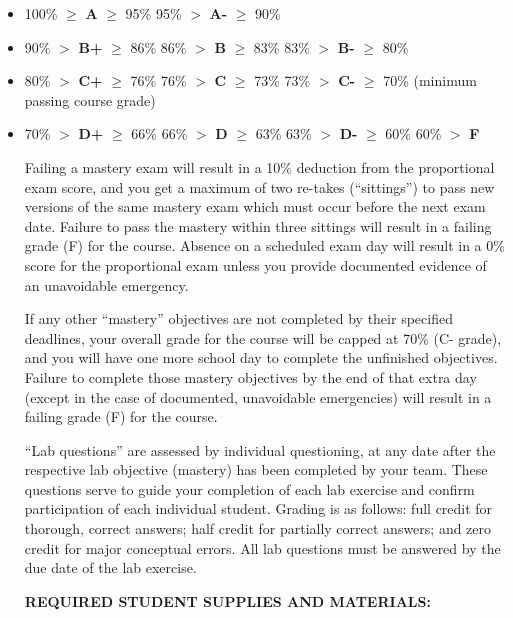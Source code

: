 \begin{itemize}
\item{} 100\% $\geq$ {\bf A} $\geq$ 95\% \hskip 33pt 95\% $>$ {\bf A-} $\geq$ 90\%
\item{} 90\% $>$ {\bf B+} $\geq$ 86\% \hskip 30pt 86\% $>$ {\bf B} $\geq$ 83\% \hskip 30pt 83\% $>$ {\bf B-} $\geq$ 80\%
\item{} 80\% $>$ {\bf C+} $\geq$ 76\% \hskip 30pt 76\% $>$ {\bf C} $\geq$ 73\% \hskip 30pt 73\% $>$ {\bf C-} $\geq$ 70\% (minimum passing course grade)
\item{} 70\% $>$ {\bf D+} $\geq$ 66\% \hskip 30pt 66\% $>$ {\bf D} $\geq$ 63\% \hskip 30pt 63\% $>$ {\bf D-} $\geq$ 60\% \hskip 30pt 60\% $>$ {\bf F}
\medskip

\vskip 10pt

Failing a mastery exam will result in a 10\% deduction from the proportional exam score, and you get a maximum of two re-takes (``sittings'') to pass new versions of the same mastery exam which must occur before the next exam date.  Failure to pass the mastery within three sittings will result in a failing grade (F) for the course.  Absence on a scheduled exam day will result in a 0\% score for the proportional exam unless you provide documented evidence of an unavoidable emergency.  

If any other ``mastery'' objectives are not completed by their specified deadlines, your overall grade for the course will be capped at 70\% (C- grade), and you will have one more school day to complete the unfinished objectives.  Failure to complete those mastery objectives by the end of that extra day (except in the case of documented, unavoidable emergencies) will result in a failing grade (F) for the course.

``Lab questions'' are assessed by individual questioning, at any date after the respective lab objective (mastery) has been completed by your team.  These questions serve to guide your completion of each lab exercise and confirm participation of each individual student.  Grading is as follows: full credit for thorough, correct answers; half credit for partially correct answers; and zero credit for major conceptual errors.  All lab questions must be answered by the due date of the lab exercise.


\vfil \eject

\noindent
{\bf REQUIRED STUDENT SUPPLIES AND MATERIALS:} 


\end{itemize}
